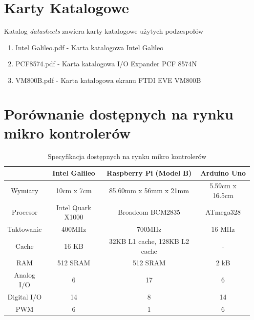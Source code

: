 \documentclass{xmgr}
\begin{document}
\appendix
\chapter{Karty Katalogowe}
Katalog \emph{datasheets} zawiera karty katalogowe użytych podzespołów
\begin{enumerate} 
\item Intel Galileo.pdf - Karta katalogowa Intel Galileo
\item PCF8574.pdf - Karta katalogowa I/O Expander PCF 8574N
\item VM800B.pdf - Karta katalogowa ekranu FTDI EVE VM800B
\end{enumerate}
\chapter{Porównanie dostępnych na rynku mikro kontrolerów}
\begin{table}[!tbh]
\begin{tabular}{|c|c|c|c|} \hline
 & \textbf{Intel Galileo} & \textbf{Raspberry Pi (Model B)} & \textbf{Arduino Uno} \\ \hline
Wymiary & 10cm x 7cm & 85.60mm x 56mm x 21mm & 5.59cm x 16.5cm \\ \hline
Procesor & Intel Quark X1000 & Broadcom BCM2835 & ATmega328 \\ \hline
Taktowanie & 400MHz	& 700MHz & 16 MHz\\ \hline
Cache & 16 KB & 32KB L1 cache, 128KB L2 cache & - \\ \hline
RAM & 512 SRAM & 512 SRAM & 2 kB \\ \hline
Analog I/O	& 6 & 17 & 6 \\ \hline
Digital I/O	& 14 & 8 & 14 \\ \hline
PWM	& 6 & 1 & 6 \\ \hline
\end{tabular}
\caption{Specyfikacja dostępnych na rynku mikro kontrolerów}
\end{table}
\end{document}
